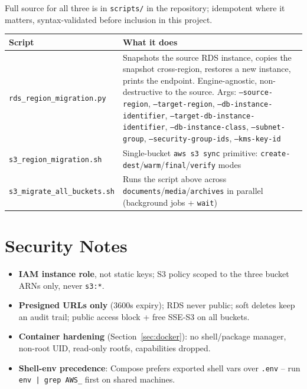 \documentclass[10pt]{article}
\begin{document}
Full source for all three is in \texttt{scripts/} in the repository;
idempotent where it matters, syntax-validated before inclusion in this
project.

\noindent \begin{tabularx}{\textwidth}{@{}l X@{}}
\toprule
\rowcolor{tableHead} \textbf{Script} & \textbf{What it does} \\
\midrule
\texttt{rds\_region\_migration.py} & Snapshots the source RDS instance, copies the snapshot cross-region, restores a new instance, prints the endpoint. Engine-agnostic, non-destructive to the source. Args: \texttt{--source-region}, \texttt{--target-region}, \texttt{--db-instance-identifier}, \texttt{--target-db-instance-identifier}, \texttt{--db-instance-class}, \texttt{--subnet-group}, \texttt{--security-group-ids}, \texttt{--kms-key-id} \\
\rowcolor{tableAlt} \texttt{s3\_region\_migration.sh} & Single-bucket \texttt{aws s3 sync} primitive: \texttt{create-dest}/\texttt{warm}/\texttt{final}/\texttt{verify} modes \\
\texttt{s3\_migrate\_all\_buckets.sh} & Runs the script above across \texttt{documents}/\texttt{media}/\texttt{archives} in parallel (background jobs + \texttt{wait}) \\
\bottomrule
\end{tabularx}

\section{Security Notes}
\begin{itemize}
  \item \textbf{IAM instance role}, not static keys; S3 policy scoped to the three bucket ARNs only, never \texttt{s3:*}.
  \item \textbf{Presigned URLs only} (3600s expiry); RDS never public; soft deletes keep an audit trail; public access block + free SSE-S3 on all buckets.
  \item \textbf{Container hardening} (Section~\ref{sec:docker}): no shell/package manager, non-root UID, read-only rootfs, capabilities dropped.
  \item \textbf{Shell-env precedence}: Compose prefers exported shell vars over \texttt{.env} -- run \texttt{env | grep AWS\_} first on shared machines.
\end{itemize}
\end{document}
